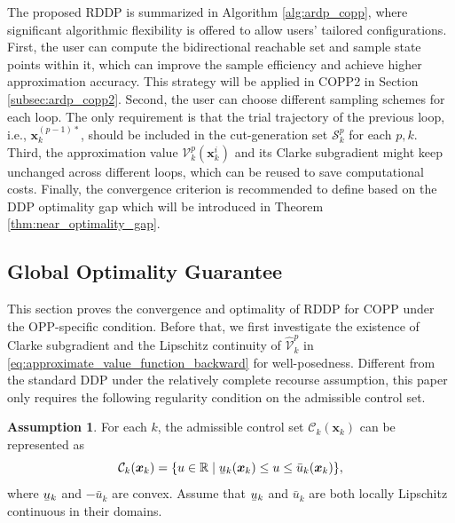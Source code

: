 \documentclass[journal]{IEEEtran}
\theoremstyle{definition}
\theoremstyle{definition}
\newtheorem{assumption}{Assumption}
\newcommand\R{{\mathbb{R}}}
\renewcommand\vector[1]{\boldsymbol{#1}}
\newcommand\vx{{\vector{x}}}
\DeclareRobustCommand{\underbar}[1]{\kern0.3\fontdimen2\font\underaccent{\bar}{\kern-0.3\fontdimen2\font #1}}
\begin{document}
The proposed RDDP is summarized in Algorithm \ref{alg:ardp_copp}, where significant algorithmic flexibility is offered to allow users' tailored configurations. First, the user can compute the bidirectional reachable set and sample state points within it, which can improve the sample efficiency and achieve higher approximation accuracy. This strategy will be applied in COPP2 in Section \ref{subsec:ardp_copp2}. Second, the user can choose different sampling schemes for each loop. The only requirement is that the trial trajectory of the previous loop, i.e., $\vx_k^{(p-1)*}$, should be included in the cut-generation set $\mathcal{S}_k^p$ for each $p,k$. Third, the approximation value $\mathcal{V}_k^p(\vx_k^i)$ and its Clarke subgradient might keep unchanged across different loops, which can be reused to save computational costs. Finally, the convergence criterion is recommended to define based on the DDP optimality gap which will be introduced in Theorem \ref{thm:near_optimality_gap}.

\subsection{Global Optimality Guarantee}\label{subsec:optimality_adrp_copp}

This section proves the convergence and optimality of RDDP for COPP under the OPP-specific condition. Before that, we first investigate the existence of Clarke subgradient and the Lipschitz continuity of $\widehat{\mathcal{V}}_k^p$ in \eqref{eq:approximate_value_function_backward} for well-posedness. Different from the standard DDP under the relatively complete recourse assumption, this paper only requires the following regularity condition on the admissible control set.

\begin{assumption}\label{assum:Lipschitz}
    For each $k$, the admissible control set $\mathcal{C}_k(\vx_k)$ can be represented as 
    \begin{equation}
    \mathcal{C}_k(\vx_k) = \{u\in\R \mid \underbar{u}_k(\vx_k)\leq u\leq \bar{u}_k(\vx_k)\},
    \end{equation}
    where $\underbar{u}_k$ and $-\bar{u}_k$ are convex. Assume that $\underbar{u}_k$ and $\bar{u}_k$ are both locally Lipschitz continuous in their domains.
\end{assumption}
\end{document}
